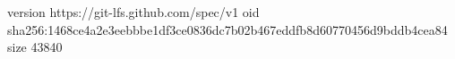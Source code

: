 version https://git-lfs.github.com/spec/v1
oid sha256:1468ce4a2e3eebbbe1df3ce0836dc7b02b467eddfb8d60770456d9bddb4cea84
size 43840
